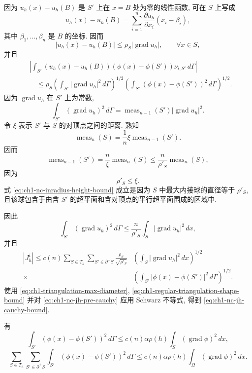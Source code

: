 \begin{Proof}
因为 $u_h(x)-u_h(B)$ 是 $S'$ 上在 $x=B$ 处为零的线性函数, 可在 $S$ 上写成
\[
u_h(x)-u_h(B)=\sum_{i=1}^n\frac{\partial u_h}{\partial x_i}(x_i-\beta_i),
\]
其中 $\beta_1,\ldots,\beta_n$ 是 $B$ 的坐标. 因而
\[
|u_h(x)-u_h(B)|\leq\rho_S|\operatorname{grad}u_h|,
\qquad\forall x\in S,
\]
并且
\[
\begin{aligned}
&\left|\int_{S'}(u_h(x)-u_h(B))(\phi(x)-\phi(S'))
\nu_{i,S'}\,d\Gamma\right|\\
&\quad\leq\rho_S
\left(\int_{S'}|\operatorname{grad}u_h|^2\,d\Gamma\right)^{1/2}
\left(\int_{S'}(\phi(x)-\phi(S'))^2\,d\Gamma\right)^{1/2}.
\end{aligned}
\]
因为 $\operatorname{grad}u_h$ 在 $S'$ 上为常数,
\[
\int_{S'}(\operatorname{grad}u_h)^2\,d\Gamma
=\operatorname{meas}_{n-1}(S')|\operatorname{grad}u_h|^2.
\]
令 $\xi$ 表示 $S'$ 与 $S$ 的对顶点之间的距离. 熟知
\[
\operatorname{meas}_n(S)=\frac1n\xi\operatorname{meas}_{n-1}(S').
\]
因而
\begin{equation}
\operatorname{meas}_{n-1}(S')
=\frac n\xi\operatorname{meas}_n(S)
\leq\frac n{\rho'_S}\operatorname{meas}_n(S),
\label{eq:ch1-nc-face-measure-bound}
\end{equation}
因为
\begin{equation}
\rho'_S\leq\xi.
\label{eq:ch1-nc-inradius-height-bound}
\end{equation}
式 \eqref{eq:ch1-nc-inradius-height-bound} 成立是因为 $S$ 中最大内接球的直径等于 $\rho'_S$, 且该球包含于由含 $S'$ 的超平面和含对顶点的平行超平面围成的区域中.

因此
\[
\int_{S'}(\operatorname{grad}u_h)^2\,d\Gamma
\leq\frac n{\rho'_S}\int_S|\operatorname{grad}u_h|^2\,dx,
\]
并且
\begin{equation}
\begin{aligned}
|J_h^i|\leq c(n)\sum_{S\in T_h}\sum_{S'\in\partial^+S}
\frac{\rho_S}{\sqrt{\rho'_S}}
&\left(\int_S|\operatorname{grad}u_h|^2\,dx\right)^{1/2}\\
{}\times&\left(\int_{S'}|\phi(x)-\phi(S')|^2\,d\Gamma\right)^{1/2}.
\end{aligned}
\label{eq:ch1-nc-jh-pre-cauchy}
\end{equation}
使用 \eqref{eq:ch1-triangulation-max-diameter}, \eqref{eq:ch1-regular-triangulation-shape-bound} 并对 \eqref{eq:ch1-nc-jh-pre-cauchy} 应用 Schwarz 不等式, 得到 \eqref{eq:ch1-nc-jh-cauchy-bound}.
\end{Proof}

\begin{Lemma}
\label{lem:ch1-nc-uniform-trace}
有
\begin{equation}
\int_{S'}(\phi(x)-\phi(S'))^2\,d\Gamma
\leq c(n)\alpha\rho(h)\int_S(\operatorname{grad}\phi)^2\,dx,
\label{eq:ch1-nc-local-trace-poincare}
\end{equation}
\begin{equation}
\sum_{S\in T_h}\sum_{S'\in\partial^+S}
\int_{S'}(\phi(x)-\phi(S'))^2\,d\Gamma
\leq c(n)\alpha\rho(h)\int_\Omega(\operatorname{grad}\phi)^2\,dx.
\label{eq:ch1-nc-global-trace-poincare}
\end{equation}
\end{Lemma}

